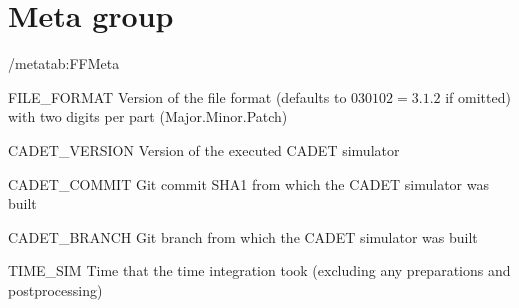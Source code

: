 \section{Meta group}

\begin{groupscope}{/meta}{tab:FFMeta}
  \begin{dataset}[type=int,inout={In}]{FILE\_FORMAT}
    Version of the file format (defaults to $030102 = 3.1.2$ if omitted) with two digits per part (Major.Minor.Patch)
  \end{dataset}
  \begin{dataset}[type=string,inout={Out}]{CADET\_VERSION}
    Version of the executed CADET simulator
  \end{dataset}
  \begin{dataset}[type=string,inout={Out}]{CADET\_COMMIT}
    Git commit SHA1 from which the CADET simulator was built
  \end{dataset}
  \begin{dataset}[type=string,inout={Out}]{CADET\_BRANCH}
    Git branch from which the CADET simulator was built
  \end{dataset}
  \begin{dataset}[type=double,unit={\si{\second}},inout={Out}]{TIME\_SIM}
    Time that the time integration took (excluding any preparations and postprocessing)
  \end{dataset}
\end{groupscope}
